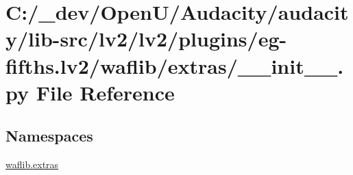 \hypertarget{lv2_2lv2_2plugins_2eg-fifths_8lv2_2waflib_2extras_2____init_____8py}{}\section{C\+:/\+\_\+dev/\+Open\+U/\+Audacity/audacity/lib-\/src/lv2/lv2/plugins/eg-\/fifths.lv2/waflib/extras/\+\_\+\+\_\+init\+\_\+\+\_\+.py File Reference}
\label{lv2_2lv2_2plugins_2eg-fifths_8lv2_2waflib_2extras_2____init_____8py}
\subsection*{Namespaces}
\begin{DoxyCompactItemize}
\item 
 \hyperlink{namespacewaflib_1_1extras}{waflib.\+extras}
\end{DoxyCompactItemize}
